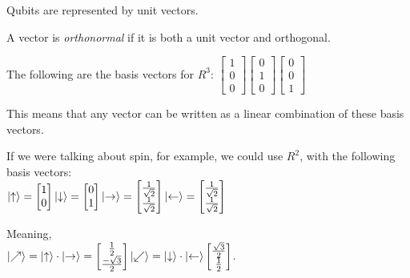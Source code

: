 
Qubits are represented by unit vectors.

\begin{definition}
    A vector is \emph{orthonormal} if it is both a unit vector and orthogonal.
\end{definition}

\begin{example}
    The following are the basis vectors for $R^3$:
    $\begin{bmatrix}
        1\\
        0\\
        0
    \end{bmatrix}
    \begin{bmatrix}
        0\\
        1\\
        0
    \end{bmatrix}
    \begin{bmatrix}
        0\\
        0\\
        1
    \end{bmatrix}$

    This means that any vector can be written as a linear combination of these basis vectors.

    If we were talking about spin, for example, we could use $R^2$, with the following basis vectors:\\
    $\lvert\uparrow\rangle = \begin{bmatrix}
        1\\
        0
    \end{bmatrix}\\
    \lvert\downarrow\rangle = \begin{bmatrix}
        0\\
        1
    \end{bmatrix}\\
    \lvert\rightarrow\rangle = \begin{bmatrix}
        \frac{1}{\sqrt{2}}\\
        \frac{1}{\sqrt{2}}
    \end{bmatrix}\\
    \lvert\leftarrow\rangle = \begin{bmatrix}
        \frac{1}{\sqrt{2}}\\
        \frac{1}{\sqrt{2}}
    \end{bmatrix}$

    Meaning,\\
    $
    \lvert\nearrow\rangle = \lvert\uparrow\rangle \cdot \lvert\rightarrow\rangle = \begin{bmatrix}
        \frac{1}{2}\\
        \frac{-\sqrt{3}}{2}
    \end{bmatrix}\\
    \lvert\swarrow\rangle = \lvert\downarrow\rangle \cdot \lvert\leftarrow\rangle \begin{bmatrix}
        \frac{\sqrt{3}}{2}\\
        \frac{1}{2}
    \end{bmatrix}
    $.
\end{example}

